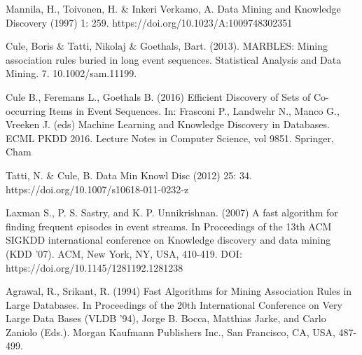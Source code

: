 \documentclass{scrartcl}
\theoremstyle{definition}
\begin{document}
\begin{thebibliography}{99}

 Mannila, H., Toivonen, H. \& Inkeri Verkamo, A. Data Mining and Knowledge Discovery (1997) 1: 259. https://doi.org/10.1023/A:1009748302351

 Cule, Boris \& Tatti, Nikolaj \& Goethals, Bart. (2013). MARBLES: Mining association rules buried in long event sequences. Statistical Analysis and Data Mining. 7. 10.1002/sam.11199. 

 Cule B., Feremans L., Goethals B. (2016) Efficient Discovery of Sets of Co-occurring Items in Event Sequences. In: Frasconi P., Landwehr N., Manco G., Vreeken J. (eds) Machine Learning and Knowledge Discovery in Databases. ECML PKDD 2016. Lecture Notes in Computer Science, vol 9851. Springer, Cham

 Tatti, N. \& Cule, B. Data Min Knowl Disc (2012) 25: 34. https://doi.org/10.1007/s10618-011-0232-z

 Laxman S., P. S. Sastry, and K. P. Unnikrishnan. (2007) A fast algorithm for finding frequent episodes in event streams. In Proceedings of the 13th ACM SIGKDD international conference on Knowledge discovery and data mining (KDD '07). ACM, New York, NY, USA, 410-419. DOI: https://doi.org/10.1145/1281192.1281238

 Agrawal, R., Srikant, R. (1994) Fast Algorithms for Mining Association Rules in Large Databases. In Proceedings of the 20th International Conference on Very Large Data Bases (VLDB '94), Jorge B. Bocca, Matthias Jarke, and Carlo Zaniolo (Eds.). Morgan Kaufmann Publishers Inc., San Francisco, CA, USA, 487-499.

\end{thebibliography}
\end{document}
